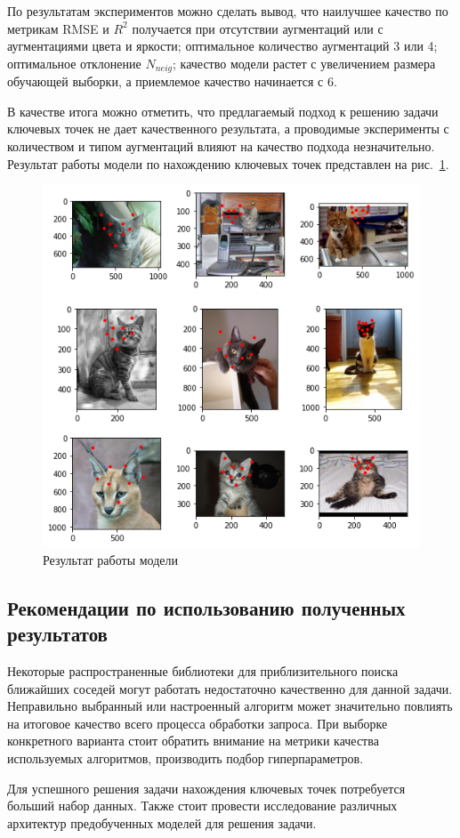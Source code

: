 \documentclass[a4paper,14pt]{article}
\begin{document}
    По результатам экспериментов можно сделать вывод, что наилучшее качество по метрикам RMSE и $R^2$ получается при отсутствии аугментаций или с аугментациями цвета и яркости; оптимальное количество аугментаций 3 или 4; оптимальное отклонение $N_{neig}$; качество модели растет с увеличением размера обучающей выборки, а приемлемое качество начинается с 6.
    
    В качестве итога можно отметить, что предлагаемый подход к решению задачи ключевых точек не дает качественного результата, а проводимые эксперименты с количеством и типом аугментаций влияют на качество подхода незначительно.
    Результат работы модели по нахождению ключевых точек представлен на рис.~\ref{fig:example_cat_dataset_model}.
    
    \begin{figure}[H]
    	\centering
    	\includegraphics[width=0.6\linewidth]{images/example_cat_dataset_model}
    	\caption{Результат работы модели}
    	\label{fig:example_cat_dataset_model}
    \end{figure}

    \subsection{Рекомендации по использованию полученных результатов}

    Некоторые распространенные библиотеки для приблизительного поиска ближайших соседей могут работать недостаточно качественно для данной задачи.
    Неправильно выбранный или настроенный алгоритм может значительно повлиять на итоговое качество всего процесса обработки запроса.
    При выборке конкретного варианта стоит обратить внимание на метрики качества используемых алгоритмов, производить подбор гиперпараметров.

    Для успешного решения задачи нахождения ключевых точек потребуется больший набор данных.
    Также стоит провести исследование различных архитектур предобученных моделей для решения задачи.
    
\end{document}
